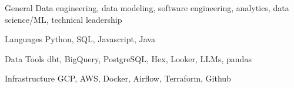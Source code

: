 

\begin{cvskills}
  \cvskill
    {General}
    {Data engineering, data modeling, software engineering, analytics, data science/ML, technical leadership}

  \cvskill
    {Languages}
    {Python, SQL, Javascript, Java}

  \cvskill
    {Data Tools}
    {dbt, BigQuery, PostgreSQL, Hex, Looker, LLMs, pandas}

  \cvskill
    {Infrastructure}
    {GCP, AWS, Docker, Airflow, Terraform, Github}

\end{cvskills}

